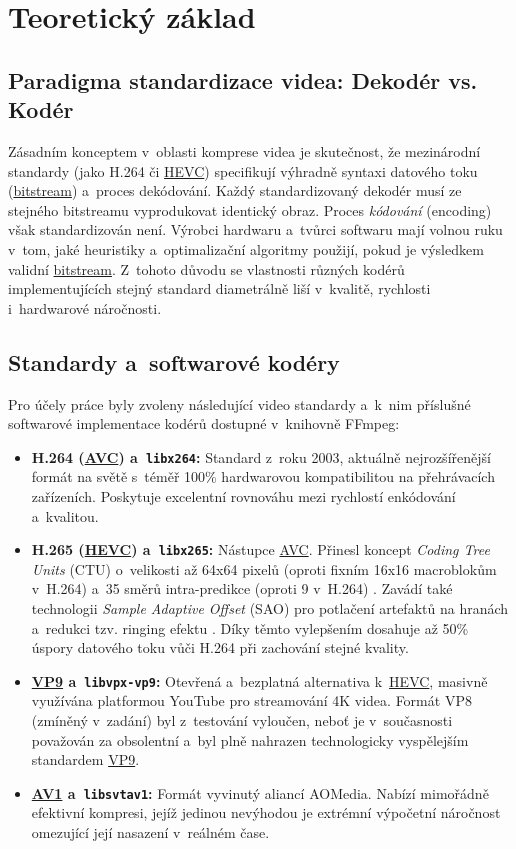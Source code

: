 \documentclass[11pt,a4paper]{article}
\begin{document}
\section{Teoretický základ}
\subsection*{Paradigma standardizace videa: Dekodér vs. Kodér}
Zásadním konceptem v~oblasti komprese videa je skutečnost, že mezinárodní standardy (jako H.264 či \hyperref[sec:standards]{HEVC}) specifikují výhradně syntaxi datového toku (\hyperref[sec:glossary]{bitstream}) a~proces dekódování. Každý standardizovaný dekodér musí ze stejného bitstreamu vyprodukovat identický obraz. Proces \textit{kódování} (encoding) však standardizován není. Výrobci hardwaru a~tvůrci softwaru mají volnou ruku v~tom, jaké heuristiky a~optimalizační algoritmy použijí, pokud je výsledkem validní \hyperref[sec:glossary]{bitstream}. Z~tohoto důvodu se vlastnosti různých kodérů implementujících stejný standard diametrálně liší v~kvalitě, rychlosti i~hardwarové náročnosti.

\subsection*{Standardy a~softwarové kodéry}
\label{sec:standards}
Pro účely práce byly zvoleny následující video standardy a~k~nim příslušné softwarové implementace kodérů dostupné v~knihovně FFmpeg:

\begin{itemize}
    \item \textbf{H.264 (\hyperref[sec:standards]{AVC}) a~\texttt{libx264}:} Standard z~roku 2003, aktuálně nejrozšířenější formát na světě s~téměř 100\% hardwarovou kompatibilitou na přehrávacích zařízeních. Poskytuje excelentní rovnováhu mezi rychlostí enkódování a~kvalitou.
    \item \textbf{H.265 (\hyperref[sec:standards]{HEVC}) a~\texttt{libx265}:} Nástupce \hyperref[sec:standards]{AVC}. Přinesl koncept \textit{Coding Tree Units} (CTU) o~velikosti až 64x64 pixelů (oproti fixním 16x16 macroblokům v~H.264) a~35 směrů intra-predikce (oproti 9 v~H.264) \cite{lec_hevc}. Zavádí také technologii \textit{Sample Adaptive Offset} (SAO) pro potlačení artefaktů na hranách a~redukci tzv. ringing efektu \cite{lec_hevc}. Díky těmto vylepšením dosahuje až 50\% úspory datového toku vůči H.264 při zachování stejné kvality.
    \item \textbf{\hyperref[sec:standards]{VP9} a~\texttt{libvpx-vp9}:} Otevřená a~bezplatná alternativa k~\hyperref[sec:standards]{HEVC}, masivně využívána platformou YouTube pro streamování 4K videa. Formát VP8 (zmíněný v~zadání) byl z~testování vyloučen, neboť je v~současnosti považován za obsolentní a~byl plně nahrazen technologicky vyspělejším standardem \hyperref[sec:standards]{VP9}.
    \item \textbf{\hyperref[sec:standards]{AV1} a~\texttt{libsvtav1}:} Formát vyvinutý aliancí AOMedia. Nabízí mimořádně efektivní kompresi, jejíž jedinou nevýhodou je extrémní výpočetní náročnost omezující její nasazení v~reálném čase.
\end{itemize}
\end{document}
